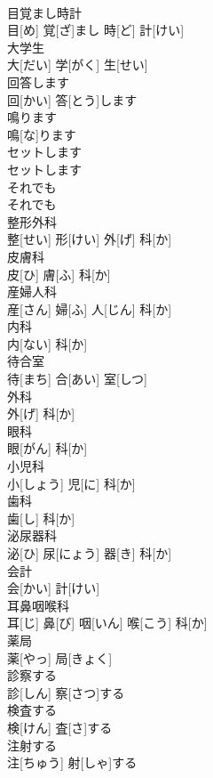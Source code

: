 \documentclass[8pt]{extreport}
\begin{document}
\begin{CJK}{UTF8}{min}
\\	目覚まし時計	
\\	目[め] 覚[ざ]まし 時[ど] 計[けい]		
\\	大学生	
\\	大[だい] 学[がく] 生[せい]		
\\	回答します	
\\	回[かい] 答[とう]します		
\\	鳴ります	
\\	鳴[な]ります		
\\	セットします	
\\	セットします		
\\	それでも	
\\	それでも		
\\	整形外科	
\\	整[せい] 形[けい] 外[げ] 科[か]		
\\	皮膚科	
\\	皮[ひ] 膚[ふ] 科[か]		
\\	産婦人科	
\\	産[さん] 婦[ふ] 人[じん] 科[か]		
\\	内科	
\\	内[ない] 科[か]		
\\	待合室	
\\	待[まち] 合[あい] 室[しつ]		
\\	外科	
\\	外[げ] 科[か]		
\\	眼科	
\\	眼[がん] 科[か]		
\\	小児科	
\\	小[しょう] 児[に] 科[か]		
\\	歯科	
\\	歯[し] 科[か]		
\\	泌尿器科	
\\	泌[ひ] 尿[にょう] 器[き] 科[か]		
\\	会計	
\\	会[かい] 計[けい]		
\\	耳鼻咽喉科	
\\	耳[じ] 鼻[び] 咽[いん] 喉[こう] 科[か]		
\\	薬局	
\\	薬[やっ] 局[きょく]		
\\	診察する	
\\	診[しん] 察[さつ]する		
\\	検査する	
\\	検[けん] 査[さ]する		
\\	注射する	
\\	注[ちゅう] 射[しゃ]する		

\end{CJK}
\end{document}
